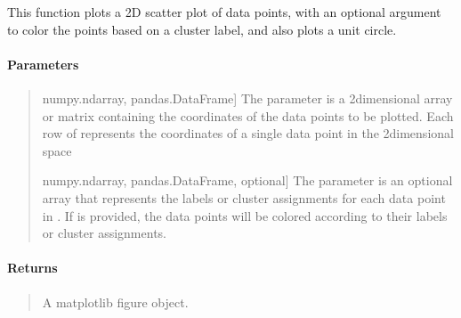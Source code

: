 \documentclass[letterpaper,10pt,english,openany,oneside]{sphinxmanual}
\begin{document}
\begin{fulllineitems}
\label{\detokenize{api_reference/generated/QuadratiK.tools.plot_clusters_2d:QuadratiK.tools.plot_clusters_2d}}
\pysigstartsignatures
{}
\pysigstopsignatures
\sphinxAtStartPar
This function plots a 2D scatter plot of data points, 
with an optional argument to color the points based on 
a cluster label, and also plots a unit circle.


\paragraph{Parameters}
\label{\detokenize{api_reference/generated/QuadratiK.tools.plot_clusters_2d:parameters}}\begin{quote}
\begin{description}
\sphinxlineitem{x}{[}numpy.ndarray, pandas.DataFrame{]}
\sphinxAtStartPar
The parameter  is a 2\sphinxhyphen{}dimensional array or matrix 
containing the coordinates of the data points to be plotted. 
Each row of  represents the coordinates of a single data point 
in the 2\sphinxhyphen{}dimensional space

\sphinxlineitem{y}{[}numpy.ndarray, pandas.DataFrame, optional{]}
\sphinxAtStartPar
The parameter  is an optional array that represents the labels 
or cluster assignments for each data point in . 
If  is provided, the data points will be colored according to their
labels or cluster assignments.

\end{description}
\end{quote}


\paragraph{Returns}
\label{\detokenize{api_reference/generated/QuadratiK.tools.plot_clusters_2d:returns}}\begin{quote}

\sphinxAtStartPar
A matplotlib figure object.
\end{quote}



\end{fulllineitems}
\end{document}
